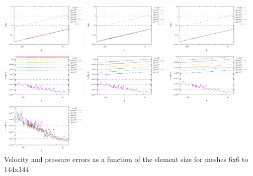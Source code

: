 \begin{center}
\includegraphics[width=4.21cm]{python_codes/fieldstone_115/results/aquarium/errorsP_global.pdf}
\includegraphics[width=4.21cm]{python_codes/fieldstone_115/results/aquarium/errorsP_local.pdf}
\includegraphics[width=4.21cm]{python_codes/fieldstone_115/results/aquarium/errorsP_macro.pdf}\\
\includegraphics[width=4.21cm]{python_codes/fieldstone_115/results/aquarium/divv_penalty.pdf}
\includegraphics[width=4.21cm]{python_codes/fieldstone_115/results/aquarium/divv_global.pdf}
\includegraphics[width=4.21cm]{python_codes/fieldstone_115/results/aquarium/divv_local.pdf}
\includegraphics[width=4.21cm]{python_codes/fieldstone_115/results/aquarium/divv_macro.pdf}\\
{\captionfont Velocity and pressure errors as a function of the element size for meshes 6x6 to 144x144}
\end{center}


